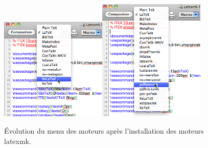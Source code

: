 \documentclass[11pt,french]{article}
\newcommand{\TS}{\textsf{\TeX Shop}}
\newcommand{\latexmk}{\textsf{latexmk}}
\newcommand{\cmd}[1]{\textsf{#1}}
\begin{document}
\begin{figure}
\centering
\includegraphics[width=2in]{figs/avant}\qquad\includegraphics[width=2in]{figs/apres}
\caption{Évolution du menu des moteurs après l'installation des moteurs \latexmk.\label{figs:popupmenus}}
\end{figure}

%
\end{document}
